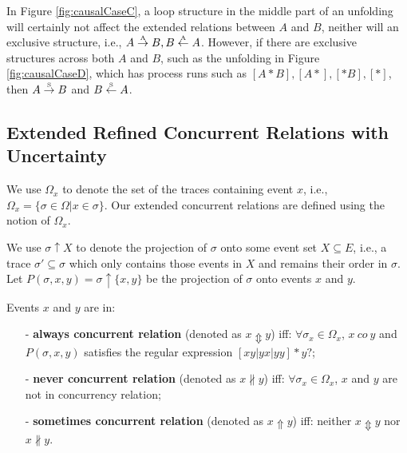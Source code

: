 \documentclass{llncs}
\begin{document}
In Figure \ref{fig:causalCaseC}, a loop structure in the middle part of an unfolding will certainly not affect the extended relations between $A$ and $B$, neither will an exclusive structure, i.e., $A\overset{\text{\tiny{A}}}{\rightarrow} B,B\overset{\text{\tiny{A}}}{\leftarrow} A$. However, if there are exclusive structures across both $A$ and $B$, such as the unfolding in Figure \ref{fig:causalCaseD}, which has process runs such as $[A*B],[A*],[*B],[*]$, then $A\overset{\text{\tiny{S}}}{\rightarrow} B$ and $B\overset{\text{\tiny{S}}}{\leftarrow} A$.

\subsection{Extended Refined Concurrent Relations with Uncertainty}\label{subsec:concurrent}
We use $\Omega_{x}$ to denote the set of the traces containing event $x$, i.e., $\Omega_{x}=\{\sigma\in\Omega|x\in\sigma\}$. Our extended concurrent relations are defined using the notion of $\Omega_{x}$.

We use $\sigma\uparrow X$ to denote the projection of $\sigma$ onto some event set $X\subseteq E$, i.e., a trace $\sigma'\subseteq\sigma$ which only contains those events in $X$ and remains their order in $\sigma$. Let $P(\sigma,x,y)=\sigma\uparrow\{x,y\}$ be the projection of $\sigma$ onto events $x$ and $y$.

\begin{definition}\label{def:extendedConcurrent}
Events $x$ and $y$ are in:
	\begin{itemize}
		\item[-] \textbf{always concurrent relation} (denoted as $x\Updownarrow y$) iff: $\forall\sigma_{x}\in\Omega_{x}$, $x~co~y$ and $P(\sigma,x,y)$ satisfies the regular expression $[xy|yx|yy]*y?$;
		\item[-] \textbf{never concurrent relation} (denoted as $x\nparallel y$) iff: $\forall\sigma_{x}\in\Omega_{x}$, $x$ and $y$ are not in concurrency relation;
		\item[-] \textbf{sometimes concurrent relation} (denoted as $x\Uparrow y$) iff: neither $x\Updownarrow y$ nor $x\nparallel y$.
	\end{itemize}
\end{definition}
\end{document}
